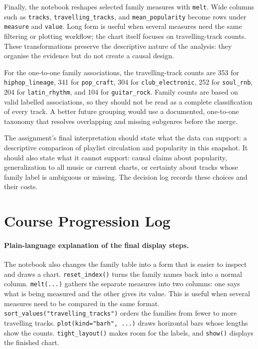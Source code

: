 \documentclass[11pt,a4paper]{article}
\begin{document}
Finally, the notebook reshapes selected family measures with \texttt{melt}. Wide columns such as \texttt{tracks}, \texttt{travelling\_tracks}, and \texttt{mean\_popularity} become rows under \texttt{measure} and \texttt{value}. Long form is useful when several measures need the same filtering or plotting workflow; the chart itself focuses on travelling-track counts. These transformations preserve the descriptive nature of the analysis: they organise the evidence but do not create a causal design.

For the one-to-one family associations, the travelling-track counts are 353 for \texttt{hiphop\_lineage}, 341 for \texttt{pop\_craft}, 304 for \texttt{club\_electronic}, 252 for \texttt{soul\_rnb}, 204 for \texttt{latin\_rhythm}, and 104 for \texttt{guitar\_rock}. Family counts are based on valid labelled associations, so they should not be read as a complete classification of every track. A better future grouping would use a documented, one-to-one taxonomy that resolves overlapping and missing subgenres before the merge.

The assignment's final interpretation should state what the data can support: a descriptive comparison of playlist circulation and popularity in this snapshot. It should also state what it cannot support: causal claims about popularity, generalization to all music or current charts, or certainty about tracks whose family label is ambiguous or missing. The decision log records these choices and their costs.

\section{Course Progression Log}

\paragraph{Plain-language explanation of the final display steps.}
The notebook also changes the family table into a form that is easier to inspect and draws a chart. \texttt{reset\_index()} turns the family names back into a normal column. \texttt{melt(...)} gathers the separate measures into two columns: one says what is being measured and the other gives its value. This is useful when several measures need to be compared in the same format. \texttt{sort\_values("travelling\_tracks")} orders the families from fewer to more travelling tracks. \texttt{plot(kind="barh", ...)} draws horizontal bars whose lengths show the counts. \texttt{tight\_layout()} makes room for the labels, and \texttt{show()} displays the finished chart.
\end{document}
